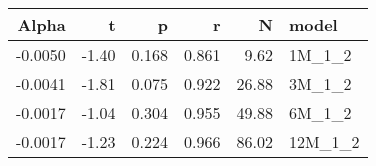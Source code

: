 \begin{table}[ht]
\centering
\begin{tabular}{rrrrrl}
  \hline
Alpha & t & p & r & N & model \\ 
  \hline
-0.0050 & -1.40 & 0.168 & 0.861 & 9.62 & 1M\_1\_2 \\ 
  -0.0041 & -1.81 & 0.075 & 0.922 & 26.88 & 3M\_1\_2 \\ 
  -0.0017 & -1.04 & 0.304 & 0.955 & 49.88 & 6M\_1\_2 \\ 
  -0.0017 & -1.23 & 0.224 & 0.966 & 86.02 & 12M\_1\_2 \\ 
   \hline
\end{tabular}
\end{table}

